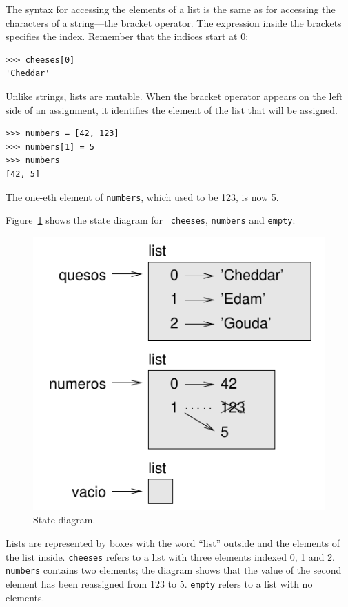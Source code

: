 \documentclass[10pt]{book}
\begin{document}
The syntax for accessing the elements of a list is the same as for
accessing the characters of a string---the bracket operator.  The
expression inside the brackets specifies the index.  Remember that the
indices start at 0:

\begin{verbatim}
>>> cheeses[0]
'Cheddar'
\end{verbatim}
%
Unlike strings, lists are mutable.  When the bracket operator appears
on the left side of an assignment, it identifies the element of the
list that will be assigned.

\begin{verbatim}
>>> numbers = [42, 123]
>>> numbers[1] = 5
>>> numbers
[42, 5]
\end{verbatim}
%
The one-eth element of {\tt numbers}, which
used to be 123, is now 5.

Figure~\ref{fig.liststate} shows
the state diagram for {\tt
cheeses}, {\tt numbers} and {\tt empty}:

\begin{figure}
\centerline
{\includegraphics[scale=0.8]{figs/liststate.pdf}}
\caption{State diagram.}
\label{fig.liststate}
\end{figure}

Lists are represented by boxes with the word ``list'' outside
and the elements of the list inside.  {\tt cheeses} refers to
a list with three elements indexed 0, 1 and 2.
{\tt numbers} contains two elements; the diagram shows that the
value of the second element has been reassigned from 123 to 5.
{\tt empty} refers to a list with no elements.
\end{document}
